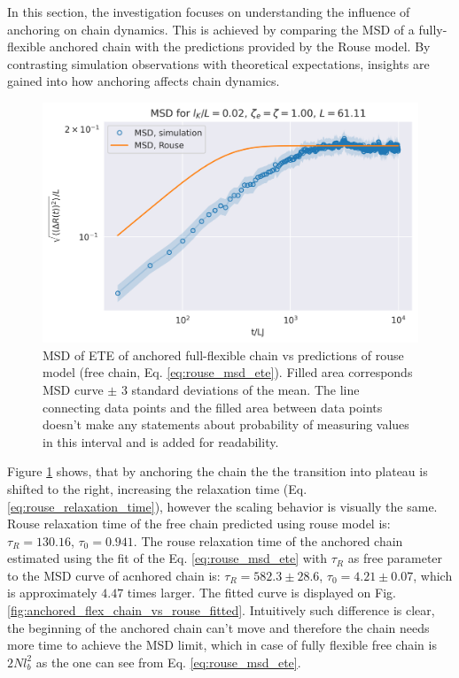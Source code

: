 \documentclass[
    paper=A4,pagesize=automedia,fontsize=12pt,
    BCOR=15mm,DIV=22,
    twoside,headinclude,footinclude=false,
    ngerman,fleqn,             %
    bibliography=totocnumbered,          %
    listof=totoc,                %
    listof=flat,                 %
    cleardoublepage=empty      %
    numbers=endperiod
]{scrartcl}
\begin{document}
In this section, the investigation focuses on understanding 
the influence of anchoring on chain dynamics. 
This is achieved by comparing the MSD of a fully-flexible anchored 
chain with the predictions provided by the Rouse model. 
By contrasting simulation observations with theoretical
expectations, insights are gained into how anchoring 
affects chain dynamics.

\begin{figure}[h]
    \begin{center}
      \includegraphics[width=\columnwidth,trim={0cm 0cm 0cm 0.9cm},clip]{3-exp-fixed-param-log.png}
      \caption{\label{fig:anchored_flex_chain_vs_rouse}
      MSD of ETE of anchored full-flexible chain vs predictions of rouse model (free chain, Eq. \ref{eq:rouse_msd_ete}).
      Filled area corresponds MSD curve $\pm$ 3 standard deviations of the mean. The
      line connecting data points and the filled area between data points doesn't make
      any statements about probability of measuring values in this interval and is
      added for readability.
      }
    \end{center}
\end{figure}

Figure \ref{fig:anchored_flex_chain_vs_rouse} shows, that by anchoring the chain
the the transition into plateau is shifted to the right, increasing the 
relaxation time (Eq. \ref{eq:rouse_relaxation_time}), 
however the scaling behavior is visually the same. Rouse relaxation time
of the free chain predicted using rouse model is: $\tau_R=130.16$, $\tau_0=0.941$. 
The rouse relaxation time of the anchored chain estimated 
using the fit of the Eq. \ref{eq:rouse_msd_ete} with $\tau_R$ as free parameter
to the MSD curve of acnhored chain is: 
$\tau_R=582.3 \pm 28.6$, $\tau_0=4.21 \pm 0.07$, which is approximately $4.47$ times
larger. The fitted curve is displayed on Fig.
\ref{fig:anchored_flex_chain_vs_rouse_fitted}.
Intuitively such difference is clear, the beginning of the anchored chain
can't move and therefore the chain needs more time to achieve the MSD limit, which
in case of fully flexible free chain is $2Nl_b^2$ as the one can see from Eq. \ref{eq:rouse_msd_ete}. 
\end{document}
